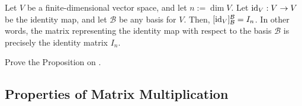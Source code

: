 \begin{proposition*}
\label{prop:identity_represents_id}
Let $V$ be a finite-di\-men\-sional vector space, and let $n := \dim V$. Let $\operatorname{id}_V: V \to V$ be the identity map, and let $\mathcal{B}$ be any basis for $V$. Then, $[\operatorname{id}_V]_{\mathcal{B}}^{\mathcal{B}} = I_n$. In other words, the matrix representing the identity map with respect to the basis $\mathcal{B}$ is precisely the identity matrix $I_n$.
\end{proposition*}

\begin{exercise}
\label{exc:identity_represents_id}
Prove the Proposition on .
\end{exercise}

\subsection{Properties of Matrix Multiplication}

